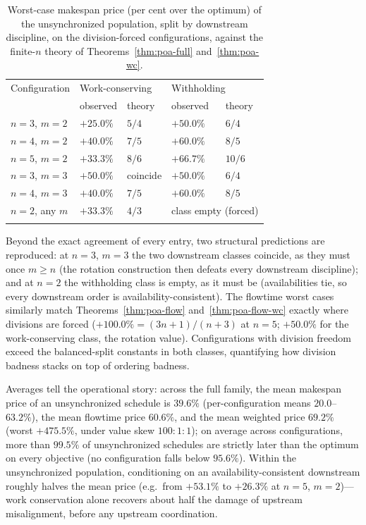 \documentclass[sn-mathphys,NameDate]{sn-jnl}
\theoremstyle{thmstyleone}
\theoremstyle{thmstylethree}
\theoremstyle{thmstyletwo}
\begin{document}
\begin{table}[h]
\caption{Worst-case makespan price (per cent over the optimum) of
the unsynchronized population, split by downstream discipline, on
the division-forced configurations, against the finite-$n$ theory
of Theorems~\ref{thm:poa-full} and~\ref{thm:poa-wc}.}
\label{tab:split}
\begin{tabular}{@{}lllll@{}}
\toprule
Configuration & \multicolumn{2}{l}{Work-conserving} &
\multicolumn{2}{l}{Withholding} \\
 & observed & theory & observed & theory \\
\midrule
$n=3$, $m=2$ & $+25.0\%$ & $5/4$ & $+50.0\%$ & $6/4$ \\
$n=4$, $m=2$ & $+40.0\%$ & $7/5$ & $+60.0\%$ & $8/5$ \\
$n=5$, $m=2$ & $+33.3\%$ & $8/6$ & $+66.7\%$ & $10/6$ \\
$n=3$, $m=3$ & $+50.0\%$ & coincide & $+50.0\%$ & $6/4$ \\
$n=4$, $m=3$ & $+40.0\%$ & $7/5$ & $+60.0\%$ & $8/5$ \\
$n=2$, any $m$ & $+33.3\%$ & $4/3$ & \multicolumn{2}{l}{class
empty (forced)} \\
\botrule
\end{tabular}
\end{table}

Beyond the exact agreement of every entry, two structural
predictions are reproduced: at $n = 3$, $m = 3$ the two downstream
classes coincide, as they must once $m \ge n$ (the rotation
construction then defeats every downstream discipline); and at
$n = 2$ the withholding class is empty, as it must be
(availabilities tie, so every downstream order is
availability-consistent). The flowtime worst cases similarly match
Theorems~\ref{thm:poa-flow} and~\ref{thm:poa-flow-wc} exactly
where divisions are forced ($+100.0\% = (3n+1)/(n+3)$ at $n=5$;
$+50.0\%$ for the work-conserving class, the rotation value).
Configurations with division freedom exceed the balanced-split
constants in both classes, quantifying how division badness stacks
on top of ordering badness.

Averages tell the operational story: across the full family, the
mean makespan price of an unsynchronized schedule is $39.6\%$
(per-configuration means $20.0$--$63.2\%$), the mean flowtime price
$60.6\%$, and the mean weighted price $69.2\%$ (worst $+475.5\%$,
under value skew $100{:}1{:}1$); on average across configurations,
more than $99.5\%$ of unsynchronized schedules are strictly later
than the optimum on every objective (no configuration falls below
$95.6\%$). Within the unsynchronized population, conditioning
on an availability-consistent downstream roughly halves the mean
price (e.g.\ from $+53.1\%$ to $+26.3\%$ at $n=5$, $m=2$)---work
conservation alone recovers about half the damage of upstream
misalignment, before any upstream coordination.
\end{document}

